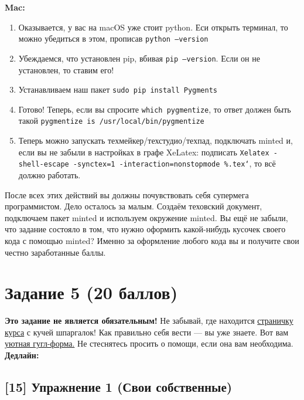 \documentclass[12pt, a4paper, oneside]{article}
\begin{document}
	\textbf{Mac:}
	
	\begin{enumerate}
		\item Оказывается, у вас на macOS уже стоит python. Еси открыть терминал, то можно убедиться в этом, прописав \texttt{python --version}
		\item Убеждаемся, что установлен pip, вбивая  \texttt{pip --version}. Если он не установлен, то ставим его!  
		\item Устанавливаем наш пакет  \texttt{sudo pip install Pygments}
		\item  Готово! Теперь, если вы спросите \texttt{which pygmentize}, то  ответ должен быть такой  \texttt{pygmentize is /usr/local/bin/pygmentize}
		\item Теперь можно запускать техмейкер/техстудио/техпад, подключать minted и, если вы не забыли в настройках  в графе  XeLatex:  подписать  \texttt{Xelatex -shell-escape -synctex=1 -interaction=nonstopmode \%.tex`}, то всё должно работать.
	\end{enumerate} 
	
	
	После всех этих действий вы должны почувствовать себя супермега программистом. Дело осталось за малым. Создаём теховский документ, подключаем пакет minted и используем окружение minted. Вы ещё не забыли, что задание состояло в том, что нужно оформить какой-нибудь кусочек своего кода с помощью minted? Именно за оформление любого кода вы и получите свои честно заработанные баллы. 
	
	
	
	
	
	
	\section*{Задание 5  (20 баллов)  }
	
	\textbf{Это задание не является обязательным!}   Не забывай, где находится  \href{https://fulyankin.github.io/LaTeX/}{страничку курса} с кучей шпаргалок! Как правильно себя вести — вы уже знаете. Вот вам \href{https://docs.google.com/forms/d/e/1FAIpQLSe11kxKVfv07iCL1E9yNX7ll9swKImiVwRr1H70lslGzInRSg/viewform}{уютная гугл-форма.}   Не стеснятесь просить о помощи, если она вам необходима. \textbf{Дедлайн:  } 
	

\subsection*{[15]  Упражнение 1  (Свои собственные)}
\end{document}
